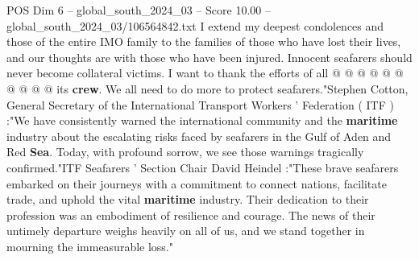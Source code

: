 \begin{textsample}{POS Dim 6 – global\_south\_2024\_03 – Score 10.00 – global\_south\_2024\_03/106564842.txt}
I extend my deepest condolences and those of the entire IMO family to the families of those who have lost their lives, and our thoughts are with those who have been injured.
Innocent seafarers should never become collateral victims.
I want to thank the efforts of all @ @ @ @ @ @ @ @ @ @ its \textbf{crew}.
We all need to do more to protect seafarers."Stephen Cotton, General Secretary of the International Transport Workers ' Federation ( ITF ) :"We have consistently warned the international community and the \textbf{maritime} industry about the escalating risks faced by seafarers in the Gulf of Aden and Red \textbf{Sea}.
Today, with profound sorrow, we see those warnings tragically confirmed."ITF Seafarers ' Section Chair David Heindel :"These brave seafarers embarked on their journeys with a commitment to connect nations, facilitate trade, and uphold the vital \textbf{maritime} industry.
Their dedication to their profession was an embodiment of resilience and courage.
The news of their untimely departure weighs heavily on all of us, and we stand together in mourning the immeasurable loss."

\end{textsample}
